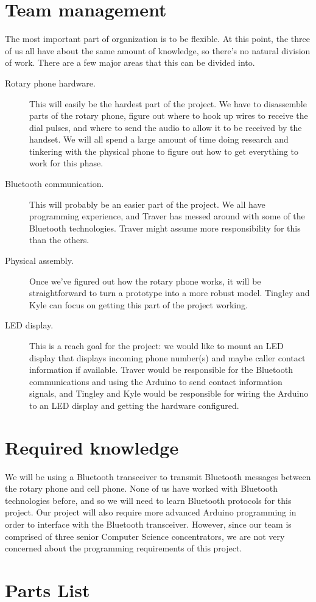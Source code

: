 \documentclass[11pt]{article}
\begin{document}
    \section{Team management}
        The most important part of organization is to be flexible. At this point, the three of us all have about the same amount of knowledge, so there's no natural division of work. There are a few major areas that this can be divided into.
        \begin{description}
            \item[Rotary phone hardware.]
                This will easily be the hardest part of the project. We have to disassemble parts of the rotary phone, figure out where to hook up wires to receive the dial pulses, and where to send the audio to allow it to be received by the handset. We will all spend a large amount of time doing research and tinkering with the physical phone to figure out how to get everything to work for this phase.
            \item[Bluetooth communication.]
                This will probably be an easier part of the project. We all have programming experience, and Traver has messed around with some of the Bluetooth technologies. Traver might assume more responsibility for this than the others.
            \item[Physical assembly.]
                Once we've figured out how the rotary phone works, it will be straightforward to turn a prototype into a more robust model. Tingley and Kyle can focus on getting this part of the project working.
            \item[LED display.]
                This is a reach goal for the project: we would like to mount an LED display that displays incoming phone number(s) and maybe caller contact information if available. Traver would be responsible for the Bluetooth communications and using the Arduino to send contact information signals, and Tingley and Kyle would be responsible for wiring the Arduino to an LED display and getting the hardware configured.
        \end{description}

    \section{Required knowledge}
        We will be using a Bluetooth transceiver to transmit Bluetooth messages between the rotary phone and cell phone. None of us have worked with Bluetooth technologies before, and so we will need to learn Bluetooth protocols for this project. Our project will also require more advanced Arduino programming in order to interface with the Bluetooth transceiver. However, since our team is comprised of three senior Computer Science concentrators, we are not very concerned about the programming requirements of this project.

    \section{Parts List}
\end{document}
